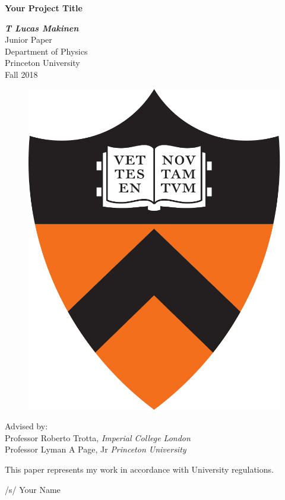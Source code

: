 \documentclass[12pt]{article}
\title{}
\author{}
\date{} %
\begin{document}
\begin{titlepage}
\centering
\Large{\textbf {Your Project Title}}
\vspace{10mm}






\Large\textit{\textbf{T Lucas Makinen}} \\
\vspace{25mm}
\large{Junior Paper \\ Department of Physics \\ Princeton University \\Fall 2018\\}
\begin{figure}[H]
\centering
\includegraphics[scale=0.1]{pton}
\end{figure}
\vspace{1mm}
\normalsize{Advised by:} \\
\normalsize{Professor Roberto Trotta, \textit{Imperial College London}} \\

\normalsize{Professor Lyman A Page, Jr \textit{Princeton University}}\\

\vfill

\vspace*{25mm}
\normalsize{This paper represents my work in accordance with University regulations.}
\begin{center} 
\normalsize{/s/ Your Name}
\end{center}

\end{titlepage}
\end{document}
